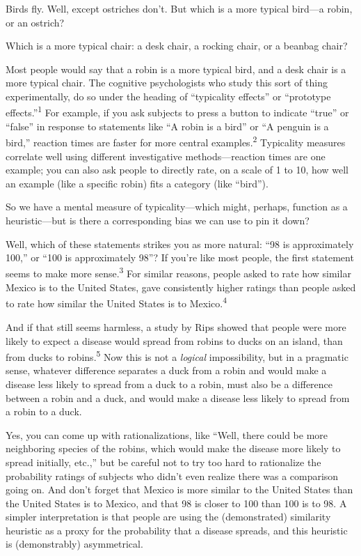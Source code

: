 {
 Birds fly. Well, except ostriches don't. But which
is a more typical bird---a robin, or an ostrich? }

{
 Which is a more typical chair: a desk chair, a rocking chair, or a
beanbag chair?}

{
 Most people would say that a robin is a more typical bird, and a
desk chair is a more typical chair. The cognitive psychologists who
study this sort of thing experimentally, do so under the heading of
``typicality effects'' or
``prototype
effects.''\textsuperscript{1} For example, if you ask
subjects to press a button to indicate
``true'' or
``false'' in response to statements
like ``A robin is a bird'' or
``A penguin is a bird,'' reaction
times are faster for more central examples.\textsuperscript{2}
Typicality measures correlate well using different investigative
methods---reaction times are one example; you can also ask people to
directly rate, on a scale of 1 to 10, how well an example (like a
specific robin) fits a category (like
``bird'').}

{
 So we have a mental measure of typicality---which might, perhaps,
function as a heuristic---but is there a corresponding bias we can use
to pin it down?}

{
 Well, which of these statements strikes you as more natural:
``98 is approximately 100,'' or
``100 is approximately 98''? If
you're like most people, the first statement seems to
make more sense.\textsuperscript{3} For similar reasons, people asked
to rate how similar Mexico is to the United States, gave consistently
higher ratings than people asked to rate how similar the United States
is to Mexico.\textsuperscript{4}}

{
 And if that still seems harmless, a study by Rips showed that
people were more likely to expect a disease would spread from robins to
ducks on an island, than from ducks to robins.\textsuperscript{5} Now
this is not a \textit{logical} impossibility, but in a pragmatic sense,
whatever difference separates a duck from a robin and would make a
disease less likely to spread from a duck to a robin, must also be a
difference between a robin and a duck, and would make a disease less
likely to spread from a robin to a duck.}

{
 Yes, you can come up with rationalizations, like
``Well, there could be more neighboring species of the
robins, which would make the disease more likely to spread initially,
etc.,'' but be careful not to try too hard to
rationalize the probability ratings of subjects who
didn't even realize there was a comparison going on.
And don't forget that Mexico is more similar to the
United States than the United States is to Mexico, and that 98 is
closer to 100 than 100 is to 98. A simpler interpretation is that
people are using the (demonstrated) similarity heuristic as a proxy for
the probability that a disease spreads, and this heuristic is
(demonstrably) asymmetrical.}


